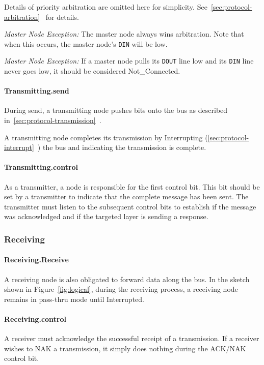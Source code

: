 Details of priority arbitration are omitted here for simplicity.
See~\ref{sec:protocol-arbitration}~ for
details.

\medskip
\noindent
{\em Master Node Exception:} The master node always wins arbitration. Note
that when this occurs, the master node's {\tt DIN} will be low.

\medskip
\noindent
{\em Master Node Exception:} If a master node pulls its {\tt DOUT} line low
and its {\tt DIN} line never goes low, it should be considered
{\sc Not\_Connected}.

\paragraph{Transmitting.{\sc send}}
During {\sc send}, a transmitting node pushes bits onto the bus as described
in~\ref{sec:protocol-transmission}~.

A transmitting node completes its transmission by Interrupting
(\ref{sec:protocol-interrupt}~) the bus and
indicating the transmission is complete.

\paragraph{Transmitting.{\sc control}}
As a transmitter, a node is responsible for the first control bit. This bit
should be set by a transmitter to indicate that the complete message has been
sent. The transmitter must listen to the subsequent control bits to establish
if the message was acknowledged and if the targeted layer is sending a
response.

\subsubsection{Receiving}

\paragraph{Receiving.{\sc Receive}}
A receiving node is also obligated to forward data along the bus. In the
sketch shown in Figure~\ref{fig:logical}, during the receiving process, a
receiving node remains in pass-thru mode until Interrupted.

\paragraph{Receiving.{\sc control}}
A receiver must acknowledge the successful receipt of a transmission. If a
receiver wishes to NAK a transmission, it simply does nothing during the
ACK/NAK control bit.

